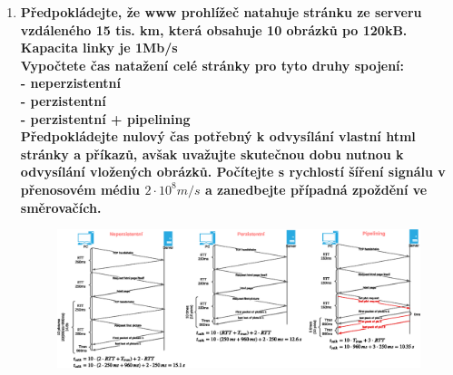 \documentclass[10pt, a4paper]{article}%
\begin{document}
\begin{enumerate}
		\clearpage
		\item\textbf{ Předpokládejte, že www prohlížeč natahuje stránku ze serveru vzdáleného 15 tis. km, která 
		obsahuje 10 obrázků po 120kB. Kapacita linky je 1Mb/s\\
		Vypočtete čas natažení celé stránky pro tyto druhy spojení:\\
		- neperzistentní\\
		- perzistentní\\
		- perzistentní + pipelining\\
		Předpokládejte nulový čas potřebný k odvysílání vlastní html stránky a příkazů, avšak uvažujte 
		skutečnou dobu nutnou k odvysílání vložených obrázků.
		Počítejte s rychlostí šíření signálu v přenosovém médiu $2\cdot10^8 m/s$ a zanedbejte případná zpoždění ve 
		směrovačích.}\\
		\begin{figure}[ht!]
			\centering
			\includegraphics[width = 1\textwidth]{HTML.eps}
		\end{figure}

		
	\end{enumerate}
	
\end{document}
